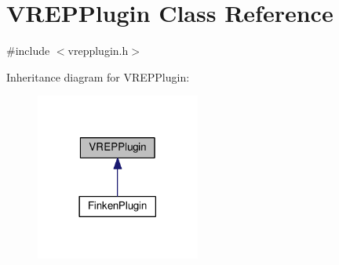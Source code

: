 \hypertarget{classVREPPlugin}{}\section{V\+R\+E\+P\+Plugin Class Reference}
\label{classVREPPlugin}


{\ttfamily \#include $<$vrepplugin.\+h$>$}



Inheritance diagram for V\+R\+E\+P\+Plugin\+:\nopagebreak
\begin{figure}[H]
\begin{center}
\leavevmode
\includegraphics[width=153pt]{classVREPPlugin__inherit__graph}
\end{center}
\end{figure}

